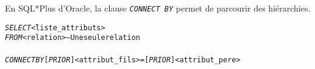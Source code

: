\documentclass[10pt]{article}
\begin{document}
				En SQL*Plus d'Oracle, la clause \emph{\texttt{CONNECT BY}} permet de parcourir des hiérarchies.
				
				\begin{alltt}
					\begin{tabbing}
						\emph{SELECT} \=<liste_attributs>\\
						\emph{FROM} \><relation> -- Une seule relation\\
						[\emph{WHERE} \><liste_conditions>]\\
						\emph{CONNECT BY} \=[\emph{PRIOR}] <attribut_fils>=[\emph{PRIOR}] <attribut_pere>\\
									\\
									\\
					\end{tabbing}
				\end{alltt}
				
\end{document}
